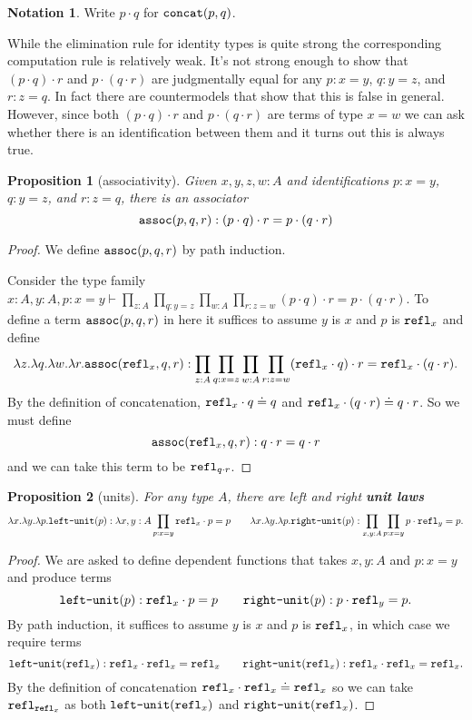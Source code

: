 \documentclass{amsart}
\theoremstyle{theorem}
\newtheorem*{prop}{Proposition}
\theoremstyle{definition}
\newtheorem*{ntn}{Notation}
\theoremstyle{remark}
\newcommand{\0}{\mathbbe{0}}
\newcommand{\1}{\mathbbe{1}}
\newcommand{\2}{\mathbbe{2}}
\newcommand{\3}{\mathbbe{3}}
\newcommand{\4}{\mathbbe{4}}
\newcommand{\term}[1]{{\textup{\texttt{#1}}}}
\newcommand{\refl}{\term{refl}}
\newcommand{\concat}{\term{concat}}
\newcommand{\assoc}{\term{assoc}}
\begin{document}
\begin{ntn} Write $p \cdot q$ for $\concat(p,q)$.
\end{ntn}

While the elimination rule for identity types is quite strong the corresponding computation rule is relatively weak. It's not strong enough to show that $(p \cdot q) \cdot r$ and $p \cdot (q \cdot r)$ are judgmentally equal for any $p : x = y$, $q : y = z$, and $r : z = q$. In fact there are countermodels that show that this is false in general. However, since both $(p \cdot q) \cdot r$ and $p \cdot (q \cdot r)$ are terms of type $x = w$ we can ask whether there is an identification between them and it turns out this is always true.

\begin{prop}[associativity] Given $x,y,z,w  :A$ and identifications $p : x = y$, $q : y =z$, and $r : z = q$, there is an associator
\[ \assoc (p,q,r) : (p \cdot q) \cdot r = p \cdot (q \cdot r)\]
\end{prop}
\begin{proof} We define $\assoc(p,q,r)$ by path induction. 

Consider the type family $x :A, y : A, p: x = y \vdash \prod_{z :A} \prod_{q : y =z} \prod_{w:A} \prod_{r : z =w} (p \cdot q) \cdot r = p \cdot (q \cdot r)$. To define a term $\assoc (p,q,r)$ in here it suffices to assume $y$ is $x$ and $p$ is $\refl_x$ and define
\[ \lambda z. \lambda q. \lambda w. \lambda r. \assoc(\refl_x, q,r) : \prod_{z :A} \prod_{q : x =z} \prod_{w:A} \prod_{r : z =w} (\refl_x \cdot q) \cdot r = \refl_x \cdot (q \cdot r).\]
By the definition of concatenation, $\refl_x \cdot q \doteq q$ and $\refl_x \cdot (q \cdot r) \doteq q \cdot r$. So we must define 
\[ \assoc(\refl_x, q,r) :  q \cdot r = q \cdot r\]
and we can take this term to be $\refl_{q \cdot r}$.
\end{proof}

\begin{prop}[units] For any type $A$, there are left and right \textbf{unit laws}
\[ \lambda x. \lambda y. \lambda p. \term{left-unit}(p) :  \lambda {x,y : A} \prod_{p: x = y} \refl_x \cdot p = p \qquad  \lambda x. \lambda y. \lambda p.\term{right-unit}(p) : \prod_{x , y : A} \prod_{p : x = y} p \cdot \refl_y = p.\]
\end{prop}
\begin{proof}
We are asked to define  dependent functions that takes $x, y :A$ and $p : x = y$ and produce terms
\[ \term{left-unit}(p) : \refl_x \cdot p = p \qquad \term{right-unit}(p) : p \cdot \refl_y = p.\]
By path induction, it suffices to assume $y$ is $x$ and $p$ is $\refl_x$, in which case we require terms
\[ \term{left-unit}(\refl_x) : \refl_x \cdot \refl_x = \refl_x \qquad \term{right-unit}(\refl_x) : \refl_x \cdot \refl_x = \refl_x.\] By the definition of concatenation $\refl_x \cdot \refl_x \doteq \refl_x$ so we can take $\refl_{\refl_x}$ as both $\term{left-unit}(\refl_x)$ and $\term{right-unit}(\refl_x)$.
\end{proof}
\end{document}
